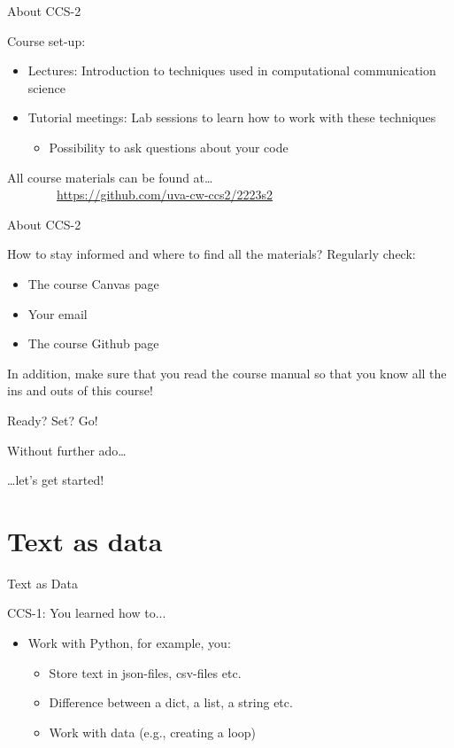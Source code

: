 \documentclass[handout]{beamer}
\begin{document}
\begin{frame}{About CCS-2} 
	
Course set-up:
\begin{itemize}
	\item Lectures: Introduction to techniques used in computational communication science
	\item Tutorial meetings: Lab sessions to learn how to work with these techniques
	\begin{itemize}
		\item Possibility to ask questions about your code
	\end{itemize}
\end{itemize}

\end{frame}

\begin{frame} 
	All course materials can be found at\ldots \\
	~~~~~~~~\url{https://github.com/uva-cw-ccs2/2223s2}
\end{frame}


\begin{frame}{About CCS-2} 
	
	How to stay informed and where to find all the materials? Regularly check:	
	\begin{itemize}
		\item The course Canvas page
		\item Your email
		\item The course Github page
	\end{itemize}

In addition, make sure that you read the course manual so that you know all the ins and outs of this course!

\end{frame}



\begin{frame}{Ready? Set? Go!} 
	
	Without further ado\dots
	
	\dots let's get started!
	
\end{frame}

\section{Text as data}

\begin{frame}{Text as Data}
	
CCS-1: You learned how to...
	\begin{itemize}
	\item Work with Python, for example, you:
	\begin{itemize}
		\item Store text in json-files, csv-files etc.
		\item Difference between a dict, a list, a string etc.
		\item Work with data (e.g., creating a loop)
	\end{itemize}
\end{itemize}
	
\end{frame}
\end{document}
